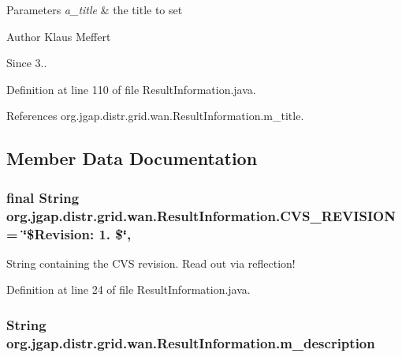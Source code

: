 \begin{DoxyParams}{Parameters}
{\em a\-\_\-title} & the title to set\\
\hline
\end{DoxyParams}
\begin{DoxyAuthor}{Author}
Klaus Meffert 
\end{DoxyAuthor}
\begin{DoxySince}{Since}
3.. 
\end{DoxySince}


Definition at line 110 of file Result\-Information.\-java.



References org.\-jgap.\-distr.\-grid.\-wan.\-Result\-Information.\-m\-\_\-title.



\subsection{Member Data Documentation}
\hypertarget{classorg_1_1jgap_1_1distr_1_1grid_1_1wan_1_1_result_information_a031eee2edaf744b6284634fa744a740e}{
\subsubsection[{C\-V\-S\-\_\-\-R\-E\-V\-I\-S\-I\-O\-N}]{\setlength{\rightskip}{0pt plus 5cm}final String org.\-jgap.\-distr.\-grid.\-wan.\-Result\-Information.\-C\-V\-S\-\_\-\-R\-E\-V\-I\-S\-I\-O\-N = \char`\"{}\$Revision\-: 1. \$\char`\"{}\hspace{0.3cm}{\ttfamily [static]}, {\ttfamily [private]}}}\label{classorg_1_1jgap_1_1distr_1_1grid_1_1wan_1_1_result_information_a031eee2edaf744b6284634fa744a740e}
String containing the C\-V\-S revision. Read out via reflection! 

Definition at line 24 of file Result\-Information.\-java.

\hypertarget{classorg_1_1jgap_1_1distr_1_1grid_1_1wan_1_1_result_information_a56eb2e03a5a32d44480b46f271f30736}{
\subsubsection[{m\-\_\-description}]{\setlength{\rightskip}{0pt plus 5cm}String org.\-jgap.\-distr.\-grid.\-wan.\-Result\-Information.\-m\-\_\-description\hspace{0.3cm}{\ttfamily [private]}}}\label{classorg_1_1jgap_1_1distr_1_1grid_1_1wan_1_1_result_information_a56eb2e03a5a32d44480b46f271f30736}


